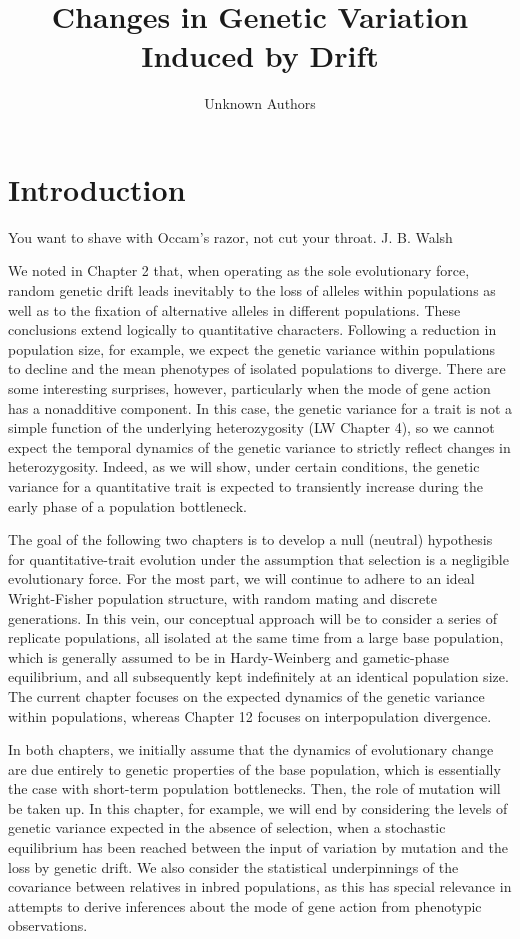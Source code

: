 \documentclass{article}
\title{Changes in Genetic Variation Induced by Drift}
\author{Unknown Authors}
\date{}
\begin{document}
\maketitle

\begin{abstract}

\end{abstract}

\section{Introduction}
You want to shave with Occam's razor, not cut your throat. J. B. Walsh

We noted in Chapter 2 that, when operating as the sole evolutionary force, random genetic drift leads inevitably to the loss of alleles within populations as well as to the fixation of alternative alleles in different populations. These conclusions extend logically to quantitative characters. Following a reduction in population size, for example, we expect the genetic variance within populations to decline and the mean phenotypes of isolated populations to diverge. There are some interesting surprises, however, particularly when the mode of gene action has a nonadditive component. In this case, the genetic variance for a trait is not a simple function of the underlying heterozygosity (LW Chapter 4), so we cannot expect the temporal dynamics of the genetic variance to strictly reflect changes in heterozygosity. Indeed, as we will show, under certain conditions, the genetic variance for a quantitative trait is expected to transiently increase during the early phase of a population bottleneck.

The goal of the following two chapters is to develop a null (neutral) hypothesis for quantitative-trait evolution under the assumption that selection is a negligible evolutionary force. For the most part, we will continue to adhere to an ideal Wright-Fisher population structure, with random mating and discrete generations. In this vein, our conceptual approach will be to consider a series of replicate populations, all isolated at the same time from a large base population, which is generally assumed to be in Hardy-Weinberg and gametic-phase equilibrium, and all subsequently kept indefinitely at an identical population size. The current chapter focuses on the expected dynamics of the genetic variance within populations, whereas Chapter 12 focuses on interpopulation divergence.

In both chapters, we initially assume that the dynamics of evolutionary change are due entirely to genetic properties of the base population, which is essentially the case with short-term population bottlenecks. Then, the role of mutation will be taken up. In this chapter, for example, we will end by considering the levels of genetic variance expected in the absence of selection, when a stochastic equilibrium has been reached between the input of variation by mutation and the loss by genetic drift. We also consider the statistical underpinnings of the covariance between relatives in inbred populations, as this has special relevance in attempts to derive inferences about the mode of gene action from phenotypic observations.
\end{document}
